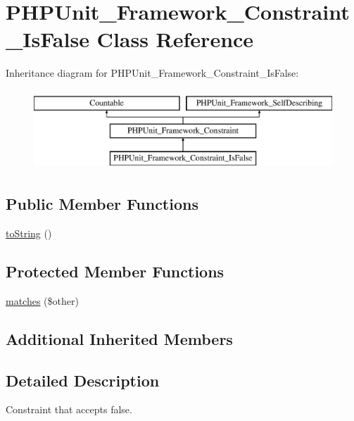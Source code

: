 \hypertarget{class_p_h_p_unit___framework___constraint___is_false}{}\section{P\+H\+P\+Unit\+\_\+\+Framework\+\_\+\+Constraint\+\_\+\+Is\+False Class Reference}
\label{class_p_h_p_unit___framework___constraint___is_false}
Inheritance diagram for P\+H\+P\+Unit\+\_\+\+Framework\+\_\+\+Constraint\+\_\+\+Is\+False\+:\begin{figure}[H]
\begin{center}
\leavevmode
\includegraphics[height=3.000000cm]{class_p_h_p_unit___framework___constraint___is_false}
\end{center}
\end{figure}
\subsection*{Public Member Functions}
\begin{DoxyCompactItemize}
\item 
\mbox{\hyperlink{class_p_h_p_unit___framework___constraint___is_false_a5558c5d549f41597377fa1ea8a1cefa3}{to\+String}} ()
\end{DoxyCompactItemize}
\subsection*{Protected Member Functions}
\begin{DoxyCompactItemize}
\item 
\mbox{\hyperlink{class_p_h_p_unit___framework___constraint___is_false_a9c9c337de483bbdbb9fa249a6c7c9cc5}{matches}} (\$other)
\end{DoxyCompactItemize}
\subsection*{Additional Inherited Members}


\subsection{Detailed Description}
Constraint that accepts false. 

